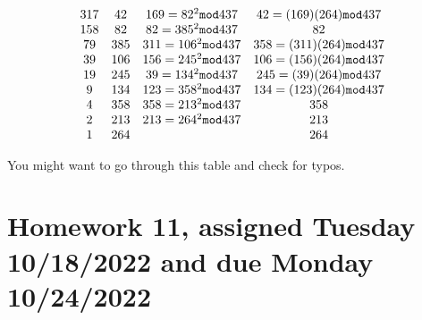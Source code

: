 \documentclass[12pt]{article}
\begin{document}
$$\begin{array}{cccc}

317 &  42 & 169= 82^2 {\tt mod}437& 42 = (169)(264){\tt mod}437\\

158 &  82 & 82 = 385^2 {\tt mod}437& 82\\

79 &  385 & 311 = 106^2 {\tt mod}437& 358 = (311)(264){\tt mod}437\\

39 &  106& 156 = 245^2 {\tt mod}437& 106= (156)(264){\tt mod}437\\

19 &  245 & 39 = 134^2 {\tt mod}437& 245 = (39)(264){\tt mod}437\\

9 &  134 & 123 = 358^2 {\tt mod}437& 134 = (123)(264){\tt mod}437\\

4 &  358 & 358 = 213^2 {\tt mod}437& 358\\
2 & 213 & 213 = 264^2 {\tt mod}437& 213\\
1 & 264 &  & 264 \\
\end{array}$$

You might want to go through this table and check for typos.

\section{Homework 11, assigned Tuesday 10/18/2022 and due Monday 10/24/2022}
\end{document}
